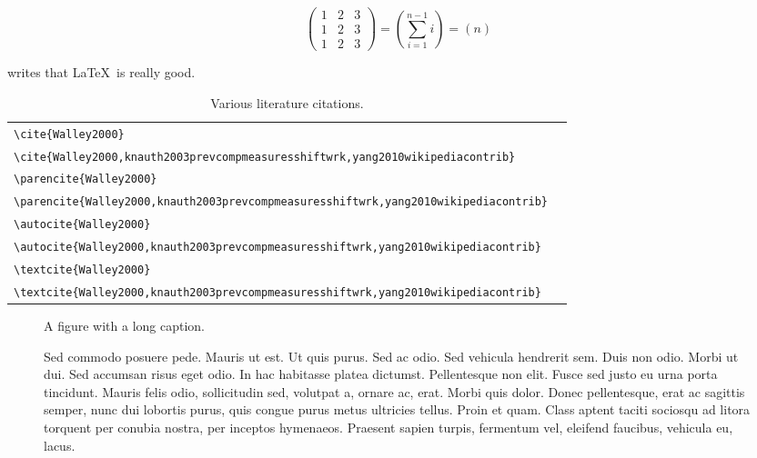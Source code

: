 \documentclass[english]{his-thesis}
\begin{document}
\begin{equation*}
    \begin{pmatrix}
      1 & 2 & 3  \\
      1 & 2 & 3  \\
      1 & 2 & 3
    \end{pmatrix}
    = \left( \sum_{i=1}^{n-1} i \right)
    = \left( n \right)
\end{equation*}

\textcite{Walley2000} writes that \LaTeX\ is really good.

\begin{table}
\begin{tabular}{L{.6\linewidth}L{.3\linewidth}}%
\toprule%
\lstinline|\cite{Walley2000}| & \cite{Walley2000} \\[0.5em]%
\lstinline|\cite{Walley2000,knauth2003prevcompmeasuresshiftwrk,yang2010wikipediacontrib}| & \cite{Walley2000,knauth2003prevcompmeasuresshiftwrk,yang2010wikipediacontrib} \\
\midrule%
\lstinline|\parencite{Walley2000}| & \parencite{Walley2000} \\[0.5em]%
\lstinline|\parencite{Walley2000,knauth2003prevcompmeasuresshiftwrk,yang2010wikipediacontrib}| & \parencite{Walley2000,knauth2003prevcompmeasuresshiftwrk,yang2010wikipediacontrib} \\
\midrule%
\lstinline|\autocite{Walley2000}| & \autocite{Walley2000} \\[0.5em]%
\lstinline|\autocite{Walley2000,knauth2003prevcompmeasuresshiftwrk,yang2010wikipediacontrib}| & \autocite{Walley2000,knauth2003prevcompmeasuresshiftwrk,yang2010wikipediacontrib} \\
\midrule%
\lstinline|\textcite{Walley2000}| & \textcite{Walley2000} \\[0.5em]%
\lstinline|\textcite{Walley2000,knauth2003prevcompmeasuresshiftwrk,yang2010wikipediacontrib}| & \textcite{Walley2000,knauth2003prevcompmeasuresshiftwrk,yang2010wikipediacontrib} \\
\bottomrule%
\end{tabular}%
\caption{Various literature citations.}
\end{table}

\begin{figure}
\centering
A figure with a long caption.
\par
\caption{Sed commodo posuere pede. Mauris ut est. Ut quis purus. Sed ac odio.
Sed vehicula hendrerit sem. Duis non odio. Morbi ut dui. Sed accumsan risus eget odio.
In hac habitasse platea dictumst. Pellentesque non elit. Fusce sed justo eu urna porta tincidunt.
Mauris felis odio, sollicitudin sed, volutpat a, ornare ac, erat.
Morbi quis dolor.
Donec pellentesque, erat ac sagittis semper, nunc dui lobortis purus, quis congue purus metus ultricies tellus.
Proin et quam.
Class aptent taciti sociosqu ad litora torquent per conubia nostra, per inceptos hymenaeos.
Praesent sapien turpis, fermentum vel, eleifend faucibus, vehicula eu, lacus.%
}
\end{figure}
\end{document}
